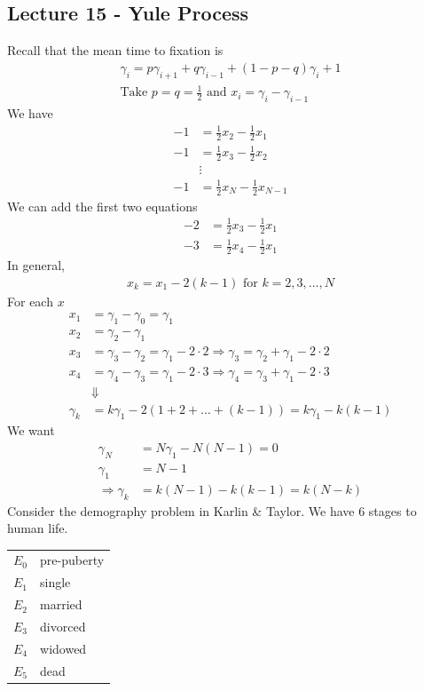 \documentclass[12pt, letterpaper]{article}
\begin{document}
\subsection{Lecture 15 - Yule Process}
Recall that the mean time to fixation is 
\begin{align*}
    \gamma_i = p\gamma_{i+1} + q\gamma_{i-1} + (1-p-q)\gamma_i + 1 \\
    \text{Take }p=q=\frac 12 \text{ and } x_i = \gamma_i-\gamma_{i-1}
\end{align*}
We have 
\begin{align*}
    -1 &= \frac 12 x_2 - \frac 12 x_1 \\
    -1 &= \frac 12 x_3 - \frac 12 x_2 \\
    &\vdots \\
    -1 &= \frac 12 x_N - \frac 12 x_{N-1}
\end{align*}
We can add the first two equations
\begin{align*}
    -2 &= \frac 12 x_3 - \frac 12 x_1 \\
    -3 &= \frac 12 x_4 - \frac 12 x_1
\end{align*}
In general,
\begin{align*}
    x_k = x_1 - 2(k-1) \text{ for } k=2,3,\dots, N
\end{align*}
For each $x$
\begin{align*}
    x_1 &= \gamma_1 - \gamma_0 = \gamma_1 \\
    x_2 &= \gamma_2 - \gamma_1 \\
    x_3 &= \gamma_3 - \gamma_2 = \gamma_1 - 2\cdot 2 \Rightarrow \gamma_3 = \gamma_2 + \gamma_1 -2\cdot 2\\
    x_4 &= \gamma_4 - \gamma_3 = \gamma_1 - 2\cdot 3 \Rightarrow \gamma_4 = \gamma_3 + \gamma_1 -2\cdot 3\\
    &\Downarrow \\
    \gamma_k &= k\gamma_1 - 2(1+2+\dots+(k-1)) = k\gamma_1 - k(k-1)
\end{align*}
We want 
\begin{align*}
    \gamma_N &= N\gamma_1 - N(N-1) = 0 \\
    \gamma_1 &= N-1 \\
    \Rightarrow \gamma_k &= k(N-1)-k(k-1) = k(N-k)
\end{align*}
 Consider the demography problem in Karlin \& Taylor. We have 6 stages to 
human life.
\begin{center}
    \begin{tabular}{c l}
        $E_0$ & pre-puberty \\
        $E_1$ & single \\
        $E_2$ & married \\
        $E_3$ & divorced \\
        $E_4$ & widowed \\
        $E_5$ & dead
    \end{tabular}
\end{center}
\end{document}
